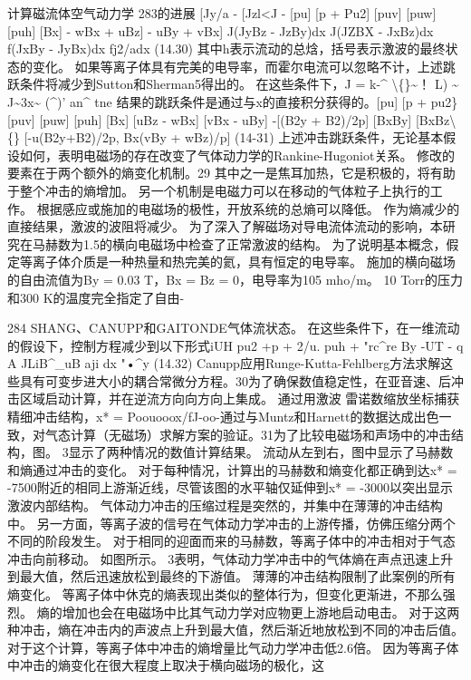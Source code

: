 \documentclass[UTF8,11pt,a4paper,openany,fontset=fandol]{ctexbook}
\begin{document}
计算磁流体空气动力学 283的进展 [Jy/a - [Jzl<J - [pu] [p + Pu2] [puv] [puw] [puh] [Bx] - wBx + uBz] - uBy + vBx] J(JyBz - JzBy)dx J(JZBX - JxBz)dx f(JxBy - JyBx)dx fj2/adx (14.30) 其中h表示流动的总焓，括号表示激波的最终状态的变化。 如果等离子体具有完美的电导率，而霍尔电流可以忽略不计，上述跳跃条件将减少到Sutton和Sherman5得出的。 在这些条件下，J = k-\textasciicircum{} \textbackslash\{\}\textasciitilde{}！ L) \textasciitilde{} J\textasciitilde{}3x\textasciitilde{} (\textasciicircum{})' an\textasciicircum{} tne 结果的跳跃条件是通过与x的直接积分获得的。[pu] [p + pu2\} [puv] [puw] [puh] [Bx] [uBz - wBx] [vBx - uBy] -[(B2y + B2)/2p] [BxBy] [BxBz\textbackslash\{\} [-u(B2y+B2)/2p, Bx(vBy + wBz)/p] (14-31) 上述冲击跳跃条件，无论基本假设如何，表明电磁场的存在改变了气体动力学的Rankine-Hugoniot关系。 修改的要素在于两个额外的熵变化机制。29 其中之一是焦耳加热，它是积极的，将有助于整个冲击的熵增加。 另一个机制是电磁力可以在移动的气体粒子上执行的工作。 根据感应或施加的电磁场的极性，开放系统的总熵可以降低。 作为熵减少的直接结果，激波的波阻将减少。 为了深入了解磁场对导电流体流动的影响，本研究在马赫数为1.5的横向电磁场中检查了正常激波的结构。 为了说明基本概念，假定等离子体介质是一种热量和热完美的氦，具有恒定的电导率。 施加的横向磁场的自由流值为By = 0.03 T，Bx = Bz = 0，电导率为105 mho/m。 10 Torr的压力和300 K的温度完全指定了自由-

284 SHANG、CANUPP和GAITONDE气体流状态。 在这些条件下，在一维流动的假设下，控制方程减少到以下形式iUH pu2 +p + 2/u. puh + "rc\textasciicircum{}re By -UT - q A JLiB\textasciicircum{}\_uB aji dx "•\textasciicircum{}y (14.32) Canupp应用Runge-Kutta-Fehlberg方法求解这些具有可变步进大小的耦合常微分方程。30为了确保数值稳定性，在亚音速、后冲击区域启动计算，并在逆流方向向方向上集成。 通过用激波 雷诺数缩放坐标捕获精细冲击结构，x* = Poouooox/fJ-oo-通过与Muntz和Harnett的数据达成出色一致，对气态计算（无磁场）求解方案的验证。31为了比较电磁场和声场中的冲击结构，图。 3显示了两种情况的数值计算结果。 流动从左到右，图中显示了马赫数和熵通过冲击的变化。 对于每种情况，计算出的马赫数和熵变化都正确到达x* = -7500附近的相同上游渐近线，尽管该图的水平轴仅延伸到x* = -3000以突出显示激波内部结构。 气体动力冲击的压缩过程是突然的，并集中在薄薄的冲击结构中。 另一方面，等离子波的信号在气体动力学冲击的上游传播，仿佛压缩分两个不同的阶段发生。 对于相同的迎面而来的马赫数，等离子体中的冲击相对于气态冲击向前移动。 如图所示。 3表明，气体动力学冲击中的气体熵在声点迅速上升到最大值，然后迅速放松到最终的下游值。 薄薄的冲击结构限制了此案例的所有熵变化。 等离子体中休克的熵表现出类似的整体行为，但变化更渐进，不那么强烈。 熵的增加也会在电磁场中比其气动力学对应物更上游地启动电击。 对于这两种冲击，熵在冲击内的声波点上升到最大值，然后渐近地放松到不同的冲击后值。 对于这个计算，等离子体中冲击的熵增量比气动力学冲击低2.6倍。 因为等离子体中冲击的熵变化在很大程度上取决于横向磁场的极化，这
\end{document}
